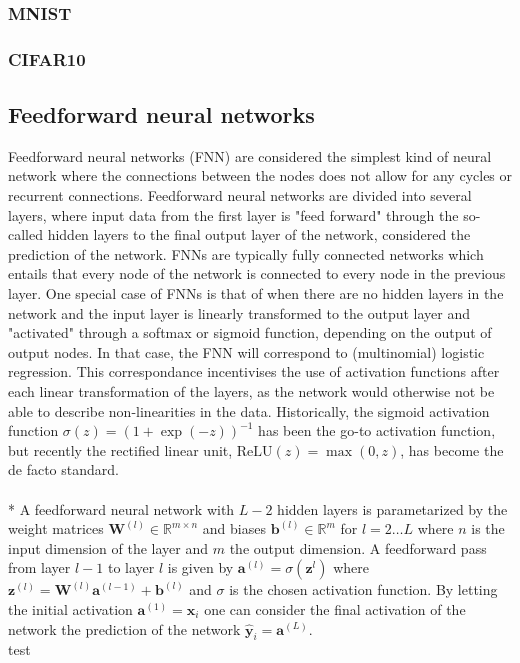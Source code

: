 \documentclass[a4paper,11pt]{article} %
\begin{document}
\subsubsection{MNIST}

\subsubsection{CIFAR10}




\subsection{Feedforward neural networks}
Feedforward neural networks (FNN) are considered the simplest kind of neural network where the connections between the nodes does not allow for any cycles or recurrent connections. Feedforward neural networks are divided into several layers, where input data from the first layer is "feed forward" through the so-called hidden layers to the final output layer of the network, considered the prediction of the network. FNNs are typically fully connected networks which entails that every node of the network is connected to every node in the previous layer. One special case of FNNs is that of when there are no hidden layers in the network and the input layer is linearly transformed to the output layer and "activated" through a softmax or sigmoid function, depending on the output of output nodes. In that case, the FNN will correspond to (multinomial) logistic regression. This correspondance incentivises the use of activation functions  after each linear transformation of the layers, as the network would otherwise not be able to describe non-linearities in the data. Historically, the sigmoid activation function $\sigma(z) = (1 + \exp(-z))^{-1}$ has been the go-to activation function, but recently the rectified linear unit, $\textrm{ReLU}(z) = \max(0, z)$, has become the de facto standard. \\
\\*
A feedforward neural network with $L-2$ hidden layers is parametarized by the weight matrices $\mathbf{W}^{(l)} \in \mathbb{R}^{m \times n}$ and biases $\mathbf{b}^{(l)} \in  \mathbb{R}^{m}$ for $l = 2 \ldots L$ where $n$ is the input dimension of the layer and $m$ the output dimension. A feedforward pass from layer $l-1$ to layer $l$ is given by $\mathbf{a}^{(l)} = \sigma(\mathbf{z}^{l})$ where $\mathbf{z}^{(l)} = \mathbf{W}^{(l)} \mathbf{a}^{(l-1)} + \mathbf{b}^{(l)}$ and $\sigma$ is the chosen activation function. By letting the initial activation $\mathbf{a}^{(1)} = \mathbf{x}_i$ one can consider the final activation of the network the prediction of the network $\mathbf{\hat{y}}_i = \mathbf{a}^{(L)}$. \\
test
\end{document}
